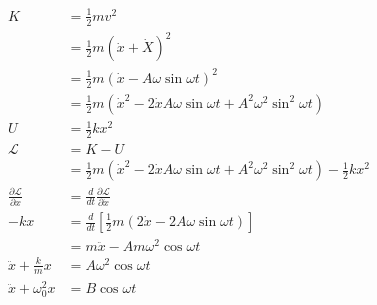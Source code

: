 \documentclass{article}
\begin{document}
\setcounter{subsection}{22}
\subsection{}

\begin{align*}
  K                                       & = \frac{1}{2} m v^2                                                                                               \\
                                          & = \frac{1}{2} m (\dot{x} + \dot{X})^2                                                                             \\
                                          & = \frac{1}{2} m (\dot{x} - A \omega \sin \omega t)^2                                                              \\
                                          & = \frac{1}{2} m (\dot{x}^2 - 2 \dot{x} A \omega \sin \omega t + A^2 \omega^2 \sin^2 \omega t)                     \\
  U                                       & = \frac{1}{2} k x^2                                                                                               \\
  \mathcal{L}                             & = K - U                                                                                                           \\
                                          & = \frac{1}{2} m (\dot{x}^2 - 2 \dot{x} A \omega \sin \omega t + A^2 \omega^2 \sin^2 \omega t) - \frac{1}{2} k x^2 \\
  \frac{\partial \mathcal{L}}{\partial x} & = \frac{d}{d t} \frac{\partial \mathcal{L}}{\partial \dot{x}}                                                     \\
  -k x                                    & = \frac{d}{d t} \left[ \frac{1}{2} m \left( 2 \dot{x} - 2 A \omega \sin \omega t \right) \right]                  \\
                                          & = m \ddot{x} - A m \omega^2 \cos \omega t                                                                         \\
  \ddot{x} + \frac{k}{m} x                & = A \omega^2 \cos \omega t                                                                                        \\
  \ddot{x} + \omega_0^2 x                 & = B \cos \omega t
\end{align*}
\end{document}
